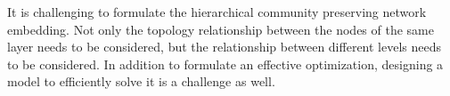 \documentclass{article}
\theoremstyle{definition}
\begin{document}
        


		It is challenging to formulate the hierarchical community preserving network embedding. Not only the topology relationship between the nodes of the same layer needs to be considered, but the relationship between different levels needs to be considered. In addition to formulate an effective optimization, designing a model to efficiently solve it is a challenge as well. 
\end{document}
